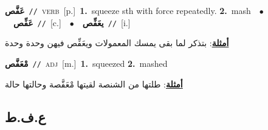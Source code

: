 \documentclass[10pt,a4paper,twoside]{article} %
\begin{document}
\begin{multicols}{2}
{\setlength\topsep{0pt}\textbf{\foreignlanguage{arabic}{عَفَّص}}\ {\color{gray}\texttt{//}\color{black}}\ \textsc{verb}\ [p.]\ \textbf{1.}~squeeze sth with force repeatedly.  \textbf{2.}~mash\ \ $\bullet$\ \ \setlength\topsep{0pt}\textbf{\foreignlanguage{arabic}{عَفِّص}}\ {\color{gray}\texttt{//}\color{black}}\ [c.]\ \ $\bullet$\ \ \setlength\topsep{0pt}\textbf{\foreignlanguage{arabic}{يعَفِّص}}\ {\color{gray}\texttt{//}\color{black}}\ [i.]\  \begin{flushright}\color{gray}\foreignlanguage{arabic}{\textbf{\underline{\foreignlanguage{arabic}{أمثلة}}}: بتذكر لما بقى يمسك المعمولات ويعَفِّص فيهن وحدة وحدة}\end{flushright}\color{black}} \vspace{2mm}

{\setlength\topsep{0pt}\textbf{\foreignlanguage{arabic}{مْعَفَّص}}\ {\color{gray}\texttt{//}\color{black}}\ \textsc{adj}\ [m.]\ \textbf{1.}~squeezed  \textbf{2.}~mashed\  \begin{flushright}\color{gray}\foreignlanguage{arabic}{\textbf{\underline{\foreignlanguage{arabic}{أمثلة}}}: طلتها من الشنصة لقيتها مْعَفَّصة وحالتها حالة}\end{flushright}\color{black}} \vspace{2mm}

\vspace{-3mm}
\subsection*{\color{blue}\foreignlanguage{arabic}{ع.ف.ط}\color{blue}{}} 


\end{multicols}
\end{document}
